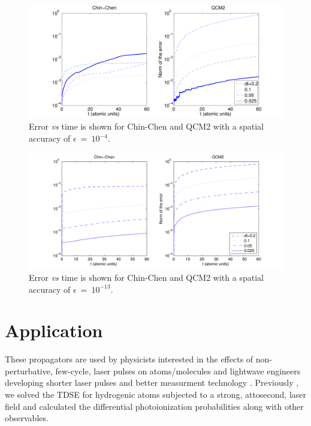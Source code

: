 \documentclass[review,letterpaper]{elsarticle}
\newcommand{\comment}[1]{} %
\begin{document}
\begin{figure}[ht]
\centering
\includegraphics[width=5in]{error_accu4}
\caption{ Error \emph{vs} time is shown for Chin-Chen and QCM2 with a spatial accuracy of $\epsilon~=~10^{-4}$. }
\label{F:accu4}
\end{figure}

\begin{figure}[htbp]
\centering
\includegraphics[width=5in]{error_accu13}
\caption{ Error \emph{vs} time is shown for Chin-Chen and QCM2 with a spatial accuracy of $\epsilon~=~10^{-13}$. }
\label{F:accu13}
\end{figure}




\section{Application}
\label{S:hatom}
These propagators are used by physicists interested in the
effects of non-perturbative, few-cycle, laser pulses on atoms/molecules \cite{Krausz:2009hz,Lin:2010cg}
and lightwave engineers developing shorter laser pulses and better measurment technology
\cite{Popmintchev:2010di}. Previously \cite{Vence:2012iy}, we solved the TDSE for hydrogenic atoms
subjected to a strong, attosecond, laser field and calculated the differential photoionization probabilities
along with other observables. \comment{Section \ref{S:AMOmethod} outlines the theoretical approximations ivolved
in our method and Section \ref{S:convdt} discusses the implementation and convergence of time evolution.}
\end{document}
